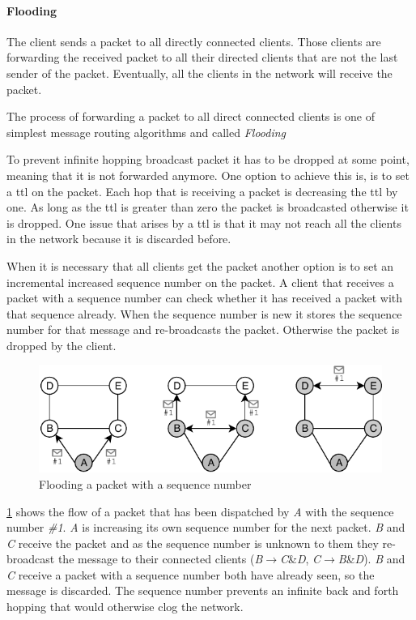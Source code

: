 \paragraph{Flooding}\label{flooding}
The client sends a packet to all directly connected clients. Those clients are forwarding the received packet to all their directed clients that are not the last sender of the packet. Eventually, all the clients in the network will receive the packet. 

The process of forwarding a packet to all direct connected clients is one of simplest message routing algorithms and called \textit{Flooding} \cite[p. 368]{tanenbaum_wetherall_2011}

To prevent infinite hopping broadcast packet it has to be dropped at some point, meaning that it is not forwarded anymore.
One option to achieve this is, is to set a \gls{ttl} on the packet. Each hop that is receiving a packet is decreasing the \gls{ttl} by one. As long as the \gls{ttl} is greater than zero the packet is broadcasted otherwise it is dropped. One issue that arises by a \gls{ttl} is that it may not reach all the clients in the network because it is discarded before.

When it is necessary that all clients get the packet another option is to set an incremental increased sequence number on the packet.
A client that receives a packet with a sequence number can check whether it has received a packet with that sequence already. When the sequence number is new it stores the sequence number for that message and re-broadcasts the packet. Otherwise the packet is dropped by the client.

\begin{figure}
\centering
\includegraphics[width=1\textwidth]{graphics/flooding-with-sequence.pdf}
\caption{Flooding a packet with a sequence number}
\label{fig:flooding}
\end{figure}

\cref{fig:flooding} shows the flow of a packet that has been dispatched by \textit{A} with the sequence number \textit{\#1}. \textit{A} is increasing its own sequence number for the next packet. \textit{B} and \textit{C} receive the packet and as the sequence number is unknown to them they re-broadcast the message to their connected clients (\textit{B}$\rightarrow$\textit{C}\&\textit{D},  \textit{C}$\rightarrow$\textit{B}\&\textit{D}). \textit{B} and \textit{C} receive a packet with a sequence number both have already seen, so the message is discarded. The sequence number prevents an infinite back and forth hopping that would otherwise clog the network.

